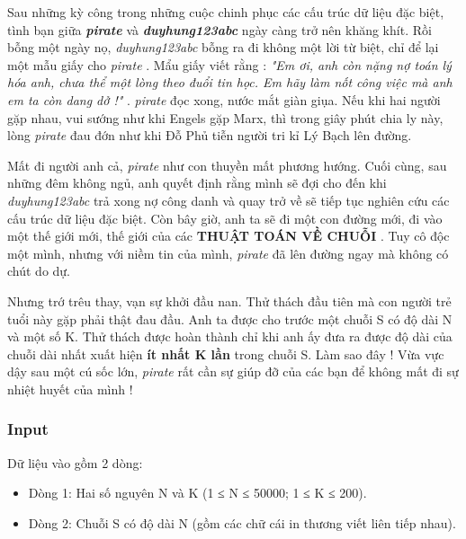 



   Sau những kỳ công trong những cuộc chinh phục các cấu trúc dữ liệu đặc biệt, tình bạn giữa   \textbf{\emph{     pirate    }}   và   \textbf{\emph{     duyhung123abc    }}   ngày càng trở nên khăng khít. Rồi bỗng một ngày nọ,   \emph{    duyhung123abc   }   bỗng ra đi không một lời từ biệt, chỉ để lại một mẫu giấy cho   \emph{    pirate   }   . Mẩu giấy viết rằng :   \emph{    "Em ơi, anh còn nặng nợ toán lý hóa anh, chưa thể một lòng theo đuổi tin học. Em hãy làm nốt công việc mà anh em ta còn dang dở !"   }   .   \emph{    pirate   }   đọc xong, nước mắt giàn giụa. Nếu khi hai người gặp nhau, vui sướng như khi Engels gặp Marx, thì trong giây phút chia ly này, lòng   \emph{    pirate   }   đau đớn như khi Đỗ Phủ tiễn người tri kỉ Lý Bạch lên đường.  

   Mất đi người anh cả,   \emph{    pirate   }   như con thuyền mất phương hướng. Cuối cùng, sau những đêm không ngủ, anh quyết định rằng mình sẽ đợi cho đến khi   \emph{    duyhung123abc   }   trả xong nợ công danh và quay trở về sẽ tiếp tục nghiên cứu các cấu trúc dữ liệu đặc biệt. Còn bây giờ, anh ta sẽ đi một con đường mới, đi vào một thế giới mới, thế giới của các   \textbf{    THUẬT TOÁN VỀ CHUỖI   }   . Tuy cô độc một mình, nhưng với niềm tin của mình,   \emph{    pirate   }   đã lên đường ngay mà không có chút do dự.  

   Nhưng trớ trêu thay, vạn sự khởi đầu nan. Thử thách đầu tiên mà con người trẻ tuổi này gặp phải thật đau đầu. Anh ta được cho trước một chuỗi S có độ dài N và một số K. Thử thách được hoàn thành chỉ khi anh ấy đưa ra được độ dài của chuỗi dài nhất xuất hiện   \textbf{    ít nhất K lần   }   trong chuỗi S. Làm sao đây ! Vừa vực dậy sau một cú sốc lớn,   \emph{    pirate   }   rất cần sự giúp đỡ của các bạn để không mất đi sự nhiệt huyết của mình !  

\subsubsection{   Input  }

   Dữ liệu vào gồm 2 dòng:  
\begin{itemize}
	\item     Dòng 1: Hai số nguyên N và K (1 ≤ N ≤ 50000; 1 ≤ K ≤ 200).   
	\item     Dòng 2: Chuỗi S có độ dài N (gồm các chữ cái in thương viết liên tiếp nhau).   
\end{itemize}



